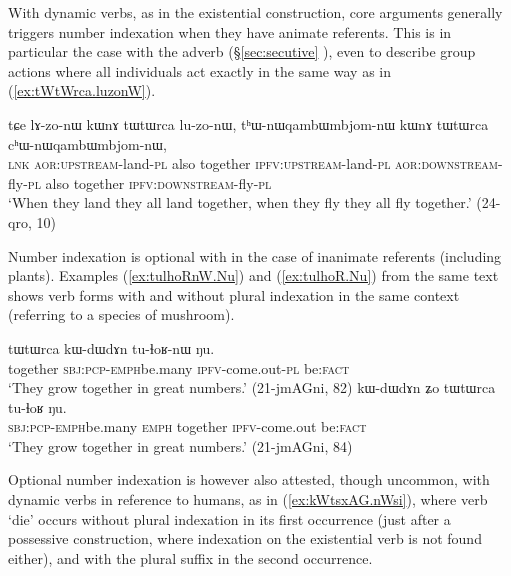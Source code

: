 With dynamic verbs, as in the existential construction, core arguments generally triggers number indexation when they have animate referents. This is in particular the case with the adverb  (§\ref{sec:secutive} ), even to describe group actions where all individuals act exactly in the same way as in (\ref{ex:tWtWrca.luzonW}).

\begin{exe}
\ex \label{ex:tWtWrca.luzonW}
\gll tɕe lɤ-zo-nɯ kɯnɤ tɯtɯrca lu-zo-nɯ, tʰɯ-nɯqambɯmbjom-nɯ kɯnɤ tɯtɯrca cʰɯ-nɯqambɯmbjom-nɯ, \\
\textsc{lnk} \textsc{aor}:\textsc{upstream}-land-\textsc{pl}  also  together  \textsc{ipfv}:\textsc{upstream}-land-\textsc{pl} \textsc{aor}:\textsc{downstream}-fly-\textsc{pl}  also together  \textsc{ipfv}:\textsc{downstream}-fly-\textsc{pl} \\
\glt `When they land they all land together, when they fly they all fly together.' (24-qro, 10)
\end{exe}

Number indexation is optional with  in the case of inanimate referents (including plants). Examples (\ref{ex:tulhoRnW.Nu}) and (\ref{ex:tulhoR.Nu}) from the same text shows verb forms with and without plural indexation in the same context (referring to a species of mushroom).

\begin{exe}
\ex 
\begin{xlist}
\ex \label{ex:tulhoRnW.Nu}
\gll tɯtɯrca kɯ-dɯ\redp{}dɤn tu-ɬoʁ-nɯ ŋu. \\
together \textsc{sbj}:\textsc{pcp}-\textsc{emph}\redp{}be.many \textsc{ipfv}-come.out-\textsc{pl} be:\textsc{fact} \\
\glt `They grow together in great numbers.' (21-jmAGni, 82)
\ex \label{ex:tulhoR.Nu}
\gll kɯ-dɯ\redp{}dɤn ʑo tɯtɯrca tu-ɬoʁ ŋu. \\
 \textsc{sbj}:\textsc{pcp}-\textsc{emph}\redp{}be.many \textsc{emph} together \textsc{ipfv}-come.out be:\textsc{fact} \\
\glt `They grow together in great numbers.'  (21-jmAGni, 84)
\end{xlist}
\end{exe}

Optional number indexation is however also attested, though uncommon, with dynamic verbs in reference to humans, as in (\ref{ex:kWtsxAG.nWsi}), where verb `die' occurs without plural indexation in its first occurrence (just after a possessive construction, where indexation on the existential verb  is not found either), and with the plural suffix  in the second occurrence.

